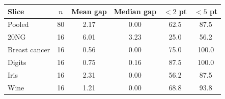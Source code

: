 \begin{tabular}{lccccc}
\toprule
Slice & $n$ & Mean gap & Median gap & $<2$ pt & $<5$ pt \\
\midrule
Pooled & 80 & 2.17 & 0.00 & 62.5 & 87.5 \\
20NG & 16 & 6.01 & 3.23 & 25.0 & 56.2 \\
Breast cancer & 16 & 0.56 & 0.00 & 75.0 & 100.0 \\
Digits & 16 & 0.75 & 0.16 & 87.5 & 100.0 \\
Iris & 16 & 2.31 & 0.00 & 56.2 & 87.5 \\
Wine & 16 & 1.21 & 0.00 & 68.8 & 93.8 \\
\bottomrule
\end{tabular}
